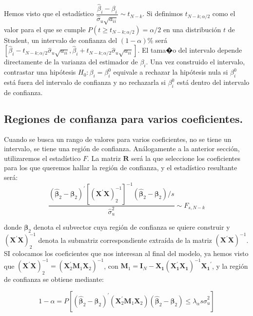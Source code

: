 Hemos visto que el estad\'istico $\dfrac{\hat{\beta}_{i}-\beta_{i}}{\hat{\sigma}_{u}\sqrt{a_{ii}}}\sim t_{N-k}$.
Si definimos $t_{N-k;\alpha/2}$ como el valor para el que se cumple
$P\left(t\geq t_{N-k;\alpha/2}\right)=\alpha/2$ en una distribuci\'on
$t$ de Student, un intervalo de confianza del $\left(1-\alpha\right)\%$
ser\'a $\left[\hat{\beta}_{i}-t_{N-k;\alpha/2}\hat{\sigma}_{u}\sqrt{a_{ii}},\hat{\beta}_{i}+t_{N-k;\alpha/2}\hat{\sigma}_{u}\sqrt{a_{ii}}\right]$.
El tama�o del intervalo depende directamente de la varianza del estimador
de $\beta_{i}$. Una vez construido el intervalo, contrastar una hip\'otesis
$H_{0}:\beta_{i}=\beta_{i}^{0}$ equivale a rechazar la hip\'otesis
nula si $\beta_{i}^{0}$ est\'a fuera del intervalo de confianza y no
rechazarla si $\beta_{i}^{0}$ est\'a dentro del intervalo de confianza.


\subsection{Regiones de confianza para varios coeficientes.}

Cuando se busca un rango de valores para varios coeficientes, no se
tiene un intervalo, se tiene una regi\'on de confianza. An\'alogamente
a la anterior secci\'on, utilizaremos el estad\'istico $F$. La matriz
$\boldsymbol{R}$ ser\'a la que seleccione los coeficientes para los
que queremos hallar la regi\'on de confianza, y el estad\'istico resultante
ser\'a:
\[
\dfrac{\left(\hat{\boldsymbol{\beta}}_{2}-\boldsymbol{\beta}_{2}\right)^{\prime}\left[\left(\boldsymbol{X}^{\prime}\boldsymbol{X}\right)_{2}^{-1}\right]^{-1}\left(\hat{\boldsymbol{\beta}}_{2}-\boldsymbol{\beta}_{2}\right)/s}{\hat{\sigma}_{u}^{2}}\sim F_{s,N-k}
\]


donde $\boldsymbol{\beta}_{2}$ denota el subvector cuya regi\'on de
confianza se quiere construir y $\left(\boldsymbol{X}^{\prime}\boldsymbol{X}\right)_{2}^{-1}$
denota la submatriz correspondiente extra\'ida de la matriz $\left(\boldsymbol{X}^{\prime}\boldsymbol{X}\right)^{-1}$.
SI colocamos los coeficientes que nos interesan al final del modelo,
ya hemos visto que $\left(\boldsymbol{X}^{\prime}\boldsymbol{X}\right)_{2}^{-1}=\left(\boldsymbol{X}^{\prime}_{2}\boldsymbol{M}_{1}\boldsymbol{X}_{2}\right)^{-1}$,
con $\boldsymbol{M}_{1}=\boldsymbol{I}_{N}-\boldsymbol{X_{1}}\left(\boldsymbol{X_{1}^{\prime}}\boldsymbol{X_{1}}\right)^{-1}\boldsymbol{X_{1}}^{\prime}$,
y la regi\'on de confianza se obtiene mediante:

\[
1-\alpha=P\left[\left(\hat{\boldsymbol{\beta}}_{2}-\boldsymbol{\beta}_{2}\right)^{\prime}\left(\boldsymbol{X}^{\prime}_{2}\boldsymbol{M}_{1}\boldsymbol{X}_{2}\right)\left(\hat{\boldsymbol{\beta}}_{2}-\boldsymbol{\beta}_{2}\right)\leq\lambda_{\alpha}s\hat{\sigma}_{u}^{2}\right]
\]


